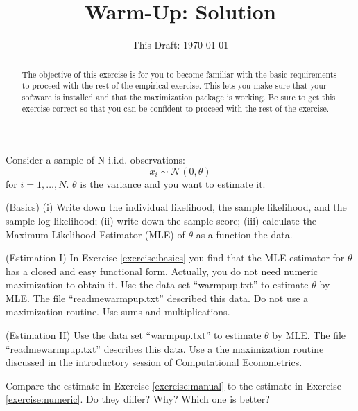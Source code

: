 



\title{Warm-Up: Solution}
\date{This Draft: \today}
\maketitle

\begin{abstract}
\noindent The objective of this exercise is for you to become familiar with the basic requirements to proceed with the rest of the empirical exercise. This lets you make sure that your software is installed and that the maximization package is working. Be sure to get this exercise correct so that you can be confident to proceed with the rest of the exercise. 
\end{abstract}

Consider a sample of N i.i.d. observations:
\begin{equation}
x_{i} \sim \mathcal{N}(0,\theta)
\end{equation}
\noindent for $i = 1, \ldots, N$. $\theta$ is the variance and you want to estimate it. 

\begin{exercise} (Basics) \label{exercise:basics}
(i) Write down the individual likelihood, the sample likelihood, and the sample log-likelihood; (ii) write down the sample score; (iii) calculate the Maximum Likelihood Estimator (MLE) of $\theta$ as a function the data.
\end{exercise}

\begin{exercise} (Estimation I) \label{exercise:manual}
In Exercise \ref{exercise:basics} you find that the MLE estimator for $\theta$ has a closed and easy functional form. Actually, you do not need numeric maximization to obtain it. Use the data set ``warmpup.txt'' to estimate $\theta$ by MLE. The file ``readmewarmpup.txt'' described this data. Do not use a maximization routine. Use sums and multiplications. 
\end{exercise}

\begin{exercise} (Estimation II) \label{exercise:numeric}
Use the data set ``warmpup.txt'' to estimate $\theta$ by MLE. The file ``readmewarmpup.txt'' describes this data. Use a the maximization routine discussed in the introductory session of Computational Econometrics.
\end{exercise}

\begin{exercise} 
Compare the estimate in Exercise \ref{exercise:manual} to the estimate in Exercise \ref{exercise:numeric}. Do they differ? Why? Which one is better?
\end{exercise}

